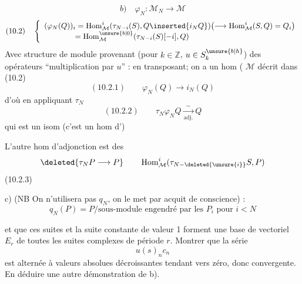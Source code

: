 \[
b)\quad\varphi_N:\mathcal M_N\longrightarrow\mathcal M
\]
\[
(10.2)\quad\left\{\begin{array}{l}
(\varphi_N(Q))_i=\operatorname{Hom}^i_{\mathcal M}(\tau_{N-i}(S),Q\inserted{i_NQ})
\bigl(\longrightarrow\operatorname{Hom}^i_{\mathcal M}(S,Q)=Q_i\bigr)\\
\hspace{4em}=\operatorname{Hom}^{\unsure{b|0}}_{\mathcal M}(\tau_{N-i}(S)[-i],Q)
\end{array}\right.
\]
Avec  structure de module provenant (pour $k\in\mathbb Z$, $u\in S_k^{\unsure{b|h}}$) des opérateurs ``multiplication par $u$'' :
en transposant; on a un hom (  $\mathcal M$ décrit dans (10.2)
\[
(10.2.1)\qquad\varphi_N(Q)\longrightarrow i_N(Q)
\]
d'où en appliquant $\tau_N$
\[
(10.2.2)\qquad\tau_N\varphi_NQ\underset{\text{adj.}}{\overset{\sim}{\longrightarrow}}Q
\]
qui est un isom (c'est un hom d')

L'autre hom d'adjonction
est  des  
\[
\deleted{\tau_NP\longrightarrow P}\qquad\operatorname{Hom}^i_{\mathcal M}(\tau_{N-\deleted{\unsure{i}}}S,P)
\]
(10.2.3)

c) (NB On n'utilisera pas $q_N$, on le met par acquit de conscience) :
\[
q_N(P)=P/\text{sous-module engendré par les }P_i\text{ pour }i<N
\]

et que ces suites et la suite constante de valeur 1 forment une base de  vectoriel $E_r$ de toutes les suites complexes de période $r$. Montrer que la série
\[
u(s)_n c_n
\]
est alternée à valeurs absolues décroissantes tendant vers zéro, donc convergente. En déduire une autre démonstration de b).

